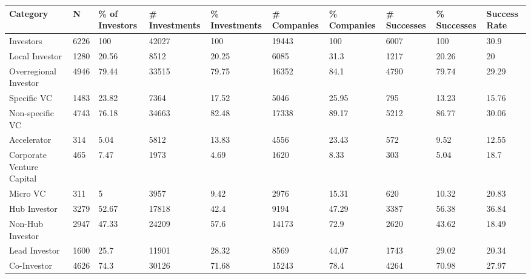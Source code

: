 \begin{tabular}{llllllllll}
  \toprule
Category & N & \% of Investors & # Investments & \% Investments & # Companies & \% Companies & # Successes & \% Successes & Success Rate \\ 
  \midrule
Investors & 6226 & 100 & 42027 & 100 & 19443 & 100 & 6007 & 100 & 30.9 \\ 
  Local Investor & 1280 & 20.56 & 8512 & 20.25 & 6085 & 31.3 & 1217 & 20.26 & 20 \\ 
  Overregional Investor & 4946 & 79.44 & 33515 & 79.75 & 16352 & 84.1 & 4790 & 79.74 & 29.29 \\ 
  Specific VC & 1483 & 23.82 & 7364 & 17.52 & 5046 & 25.95 & 795 & 13.23 & 15.76 \\ 
  Non-specific VC & 4743 & 76.18 & 34663 & 82.48 & 17338 & 89.17 & 5212 & 86.77 & 30.06 \\ 
  Accelerator & 314 & 5.04 & 5812 & 13.83 & 4556 & 23.43 & 572 & 9.52 & 12.55 \\ 
  Corporate Venture Capital & 465 & 7.47 & 1973 & 4.69 & 1620 & 8.33 & 303 & 5.04 & 18.7 \\ 
  Micro VC & 311 & 5 & 3957 & 9.42 & 2976 & 15.31 & 620 & 10.32 & 20.83 \\ 
  Hub Investor & 3279 & 52.67 & 17818 & 42.4 & 9194 & 47.29 & 3387 & 56.38 & 36.84 \\ 
  Non-Hub Investor & 2947 & 47.33 & 24209 & 57.6 & 14173 & 72.9 & 2620 & 43.62 & 18.49 \\ 
  Lead Investor & 1600 & 25.7 & 11901 & 28.32 & 8569 & 44.07 & 1743 & 29.02 & 20.34 \\ 
  Co-Investor & 4626 & 74.3 & 30126 & 71.68 & 15243 & 78.4 & 4264 & 70.98 & 27.97 \\ 
   \bottomrule
\end{tabular}

